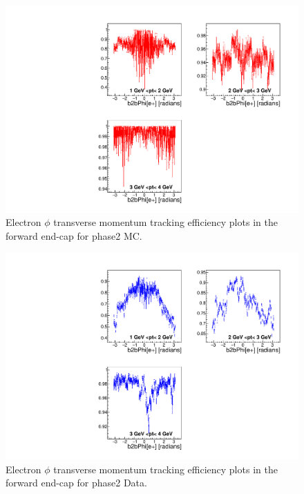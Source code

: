\documentclass[a4paper,11pt,twosided,final,german,openbib,pdftex,listof=totoc,bibliography=totoc]{scrbook}
\begin{document}
\begin{appendix}
\begin{figure}[!htbp]
	\centering
	\includegraphics[width=\textwidth]{Plots/master/xPtMPhiemFC_MC}
	\caption[Transverse Momentum $\phi$ Electron Forward End-Cap Efficiency Phase2 MC]{Electron $\phi$ transverse momentum tracking efficiency plots in the forward end-cap for phase2 MC.}
	\label{plt:PtMPhiemFC_MC}
\end{figure}


\begin{figure}[!htbp]
	\centering
	\includegraphics[width=\textwidth]{Plots/master/xPtMPhiemFC_Data}
	\caption[Transverse Momentum $\phi$ Electron Forward End-Cap Efficiency Phase2 Data]{Electron $\phi$ transverse momentum tracking efficiency plots in the forward end-cap for phase2 Data.}
	\label{plt:PtMPhiemFC_Data}
\end{figure}




\end{appendix}
\end{document}
